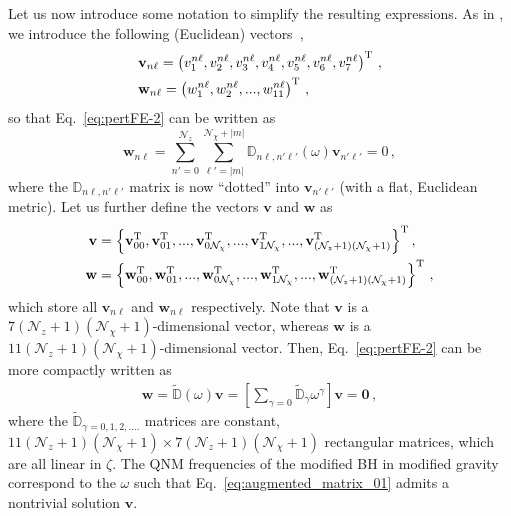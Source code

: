 \documentclass[aps,prx,amsmath,floats,floatfix,twocolumn,
  superscriptaddress,nofootinbib,showpacs]{revtex4-1}
\begin{document}
Let us now introduce some notation to simplify the resulting expressions. As in \cite{Chung:2023zdq}, we introduce the following (Euclidean) vectors~\cite{Chung:2023zdq}, 
\begin{equation}\label{eq:vector_arrangement}
\begin{split}
& \textbf{v}_{n \ell} = \left( v_1^{n \ell}, v_2^{n \ell}, v_3^{n \ell}, v_4^{n \ell}, v_5^{n \ell}, v_6^{n \ell}, v_7^{n \ell} \right)^{\rm T} \,, \\
& \textbf{w}_{n \ell} = \left( w_1^{n \ell}, w_2^{n \ell}, ..., w_{11}^{n \ell} \right)^{\rm T} \,,
\end{split}
\end{equation}
so that Eq.~\eqref{eq:pertFE-2} can be written as 
\begin{equation}\label{eq:vector_equations}
\textbf{w}_{n \ell} = \sum_{n'=0}^{\mathcal{N}_z} \sum_{\ell'=|m|}^{\mathcal{N}_{\chi}+|m|} \mathbb{D}_{n \ell, n' \ell'}(\omega) \textbf{v}_{n' \ell'} = 0\,,
\end{equation}
where the $\mathbb{D}_{n \ell, n' \ell'}$ matrix is now ``dotted'' into $\textbf{v}_{n' \ell'}$ (with a flat, Euclidean metric). 
Let us further define the vectors $\textbf{v}$ and $\textbf{w}$ as
\begin{equation}
\begin{split}
\textbf{v} & = \left\{ \textbf{v}_{00}^{\rm T}, \textbf{v}_{01}^{\rm T}, ..., \textbf{v}_{0 \mathcal{N}_{\chi}}^{\rm T}, ..., \textbf{v}_{1 \mathcal{N}_{\chi}}^{\rm T}, ...,  \textbf{v}_{(\mathcal{N}_{z}+1)(\mathcal{N}_{\chi}+1)}^{\rm T} \right\}^{\rm T}, \\
\textbf{w} & = \left\{ \textbf{w}_{00}^{\rm T}, \textbf{w}_{01}^{\rm T}, ..., \textbf{w}_{0 \mathcal{N}_{\chi}}^{\rm T}, ..., \textbf{w}_{1 \mathcal{N}_{\chi}}^{\rm T}, ...,  \textbf{w}_{(\mathcal{N}_{z}+1)(\mathcal{N}_{\chi}+1)}^{\rm T} \right\}^{\rm T}\,,
\end{split}
\end{equation}
which store all $\textbf{v}_{n \ell}$ and $\textbf{w}_{n \ell}$  respectively.
Note that $\textbf{v}$ is a $7(\mathcal{N}_{z}+1)(\mathcal{N}_{\chi}+1)$-dimensional vector, whereas $\textbf{w}$ is a $11(\mathcal{N}_{z}+1)(\mathcal{N}_{\chi}+1)$-dimensional vector.
Then, Eq.~\eqref{eq:pertFE-2} can be more compactly written as 
\begin{equation}\label{eq:augmented_matrix_01}
\begin{split}
\textbf{w} = \tilde{\mathbb{D}} (\omega) \textbf{v} = \left[ \sum_{\gamma=0} \tilde{\mathbb{D}}_{\gamma} \omega^\gamma \right] \textbf{v} = \textbf{0} \,,
\end{split}
\end{equation}
where the $\tilde{\mathbb{D}}_{\gamma = 0,1,2, ....}$ matrices are constant, $ 11 (\mathcal{N}_z + 1)(\mathcal{N}_{\chi} + 1) \times 7 (\mathcal{N}_z + 1)(\mathcal{N}_{\chi} + 1) $ rectangular matrices, which are all linear in $\zeta$. 
The QNM frequencies of the modified BH in modified gravity correspond to the $\omega$ such that Eq.~\eqref{eq:augmented_matrix_01} admits a nontrivial solution $\textbf{v}$. 
\end{document}
